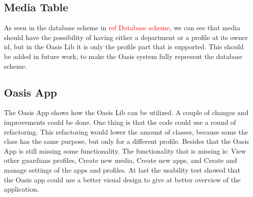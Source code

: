 \subsection{Media Table}
As seen in the database scheme in \textcolor{red}{ref Database scheme}, we can see that media should have the possibility of having either a department or a profile at its owner id, but in the Oasis Lib it is only the profile part that is supported. This should be added in future work, to make the Oasis system fully  represent the database scheme.

\subsection{Oasis App}
The Oasis App shows how the Oasis Lib can be utilized. A couple of changes and improvements could be done. One thing is that the code could use a round of refactoring. This refactoring would lower the amount of classes, because some the class has the same purpose, but only for a different profile. Besides that the Oasis App is still missing some functionality. The functionality that is missing is: View other guardians profiles, Create new media, Create new apps, and Create and manage settings of the apps and profiles. At last the usability test showed that the Oasis app could use a better visual design to give at better overview of the application.